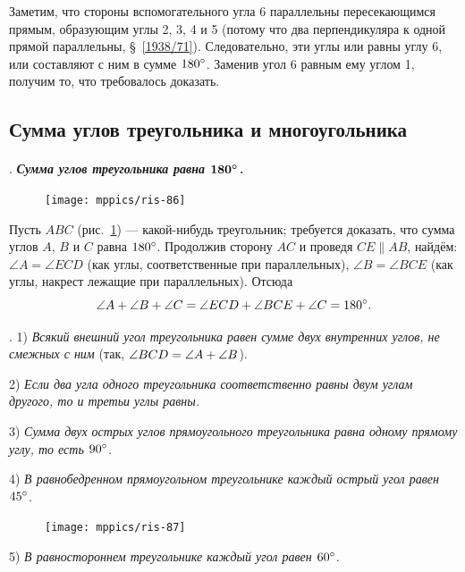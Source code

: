 \documentclass[oneside]{book}
\begin{document}
Заметим, что стороны вспомогательного угла 6 параллельны пересекающимся прямым, образующим углы 2, 3, 4 и 5 (потому что два перпендикуляра к одной прямой параллельны, §~\ref{1938/71}). 
Следовательно, эти углы или равны углу 6, или составляют с ним в сумме $180\degree$.
Заменив угол 6 равным ему углом 1, получим то, что требовалось доказать.

\subsection*{Сумма углов треугольника и многоугольника}

\paragraph{}\label{1938/81}
\mbox{.}
\textbf{\emph{Сумма углов треугольника равна $\bm{180\degree}$.}}

\begin{figure}
\centering
\texttt{[image: mppics/ris-86]}
\caption{}\label{1938/ris-86}
\end{figure}


Пусть $ABC$ (рис.~\ref{1938/ris-86}) — какой-нибудь треугольник;
требуется доказать, что сумма углов $A$, $B$ и $C$ равна $180\degree$.
Продолжив сторону $AC$ и проведя $CE\parallel AB$, найдём:
$\angle A = \angle ECD$ (как углы, соответственные при параллельных), $\angle B = \angle BCE$ (как углы, накрест лежащие при параллельных). 
Отсюда
\[\angle A + \angle B+\angle C = \angle ECD + \angle BCE + \angle C =180\degree.\]

\smallskip
{}.
1) \emph{Всякий внешний угол треугольника равен сумме двух внутренних углов, не смежных с ним} (так, $\angle BCD \z= \angle A + \angle B$).

2) \emph{Если два угла одного треугольника соответственно равны двум углам другого, то и третьи углы равны.}

3) \emph{Сумма двух острых углов прямоугольного треугольника равна одному прямому углу, то есть $90\degree$.}

4) \emph{В равнобедренном прямоугольном треугольнике каждый острый угол равен $45\degree$.}

\begin{figure}
\centering
\texttt{[image: mppics/ris-87]}
\caption{}\label{1938/ris-87}
\end{figure}

5) \emph{В равностороннем треугольнике каждый угол равен $60\degree$.}
\end{document}
